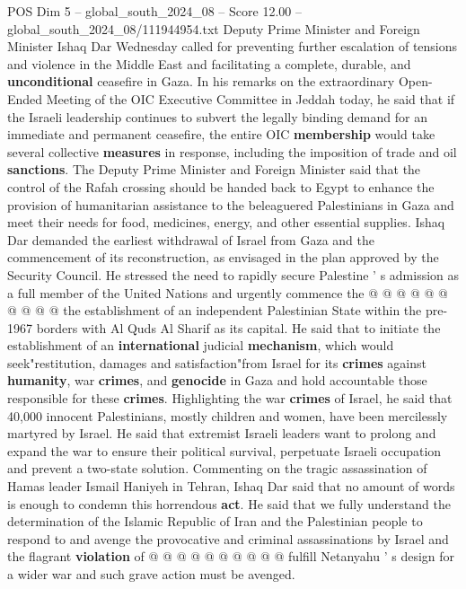 \begin{textsample}{POS Dim 5 – global\_south\_2024\_08 – Score 12.00 – global\_south\_2024\_08/111944954.txt}  \label{ex:f5_pos_287}
Deputy Prime Minister and Foreign Minister Ishaq Dar Wednesday called for preventing further escalation of tensions and violence in the Middle East and facilitating a complete, durable, and \textbf{unconditional} ceasefire in Gaza.
In his remarks on the extraordinary Open-Ended Meeting of the OIC Executive Committee in Jeddah today, he said that if the Israeli leadership continues to subvert the legally binding demand for an immediate and permanent ceasefire, the entire OIC \textbf{membership} would take several collective \textbf{measures} in response, including the imposition of trade and oil \textbf{sanctions}.
The Deputy Prime Minister and Foreign Minister said that the control of the Rafah crossing should be handed back to Egypt to enhance the provision of humanitarian assistance to the beleaguered Palestinians in Gaza and meet their needs for food, medicines, energy, and other essential supplies.
Ishaq Dar demanded the earliest withdrawal of Israel from Gaza and the commencement of its reconstruction, as envisaged in the plan approved by the Security Council.
He stressed the need to rapidly secure Palestine ' s admission as a full member of the United Nations and urgently commence the @ @ @ @ @ @ @ @ @ @ the establishment of an independent Palestinian State within the pre-1967 borders with Al Quds Al Sharif as its capital.
He said that to initiate the establishment of an \textbf{international} judicial \textbf{mechanism}, which would seek"restitution, damages and satisfaction"from Israel for its \textbf{crimes} against \textbf{humanity}, war \textbf{crimes}, and \textbf{genocide} in Gaza and hold accountable those responsible for these \textbf{crimes}.
Highlighting the war \textbf{crimes} of Israel, he said that 40,000 innocent Palestinians, mostly children and women, have been mercilessly martyred by Israel.
He said that extremist Israeli leaders want to prolong and expand the war to ensure their political survival, perpetuate Israeli occupation and prevent a two-state solution.
Commenting on the tragic assassination of Hamas leader Ismail Haniyeh in Tehran, Ishaq Dar said that no amount of words is enough to condemn this horrendous \textbf{act}.
He said that we fully understand the determination of the Islamic Republic of Iran and the Palestinian people to respond to and avenge the provocative and criminal assassinations by Israel and the flagrant \textbf{violation} of @ @ @ @ @ @ @ @ @ @ fulfill Netanyahu ' s design for a wider war and such grave action must be avenged.

\end{textsample}
